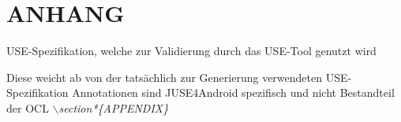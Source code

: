 \documentclass[a4paper,twoside]{article}
\begin{document}
\section*{\uppercase{Anhang}}

\noindent 
USE-Spezifikation, welche zur Validierung durch das USE-Tool genutzt wird 




Diese weicht ab von der tatsächlich zur Generierung verwendeten USE-Spezifikation 
 Annotationen sind JUSE4Android spezifisch und nicht Bestandteil der OCL
\textit{$\backslash$section*\{APPENDIX\}}


\vfill
\end{document}
